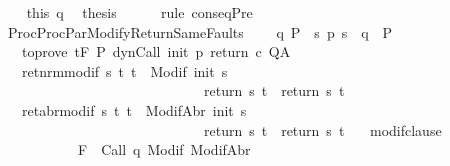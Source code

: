 \begin{isabellebody}
\ \ \isamarkupfalse%
\ this\ q\ \isamarkupfalse%
\ {\isacharquery}thesis\isanewline
\ \ \ \ \isamarkupfalse%
\ {\isacharparenleft}rule\ conseqPre{\isacharparenright}\ \isanewline
{}\isamarkupfalse%
%
\endisatagproof
{\isafoldproof}%
%
\isadelimproof
\isanewline
%
\endisadelimproof
\isanewline
\isanewline
\isanewline
{}\isamarkupfalse%
\ ProcProcParModifyReturnSameFaults{\isacharcolon}\ \isanewline
\ \ \ q{\isacharcolon}\ {\isachardoublequoteopen}P\ {\isasymsubseteq}\ {\isacharbraceleft}s{\isachardot}\ p\ s\ {\isacharequal}\ q{\isacharbraceright}\ {\isasyminter}\ P{\isacharprime}{\isachardoublequoteclose}\isanewline
\ \ \ %
\isanewline
\ \ \ to{\isacharunderscore}prove{\isacharcolon}\ {\isachardoublequoteopen}{\isasymGamma}{\isacharcomma}{\isasymTheta}{\isasymturnstile}\isactrlsub t\isactrlbsub {\isacharslash}F\isactrlesub \ P{\isacharprime}\ {\isacharparenleft}dynCall\ init\ p\ return{\isacharprime}\ c{\isacharparenright}\ Q{\isacharcomma}A{\isachardoublequoteclose}\isanewline
\ \ \ ret{\isacharunderscore}nrm{\isacharunderscore}modif{\isacharcolon}\ {\isachardoublequoteopen}{\isasymforall}s\ t{\isachardot}\ t\ {\isasymin}\ {\isacharparenleft}Modif\ {\isacharparenleft}init\ s{\isacharparenright}{\isacharparenright}\ \isanewline
\ \ \ \ \ \ \ \ \ \ \ \ \ \ \ \ \ \ \ \ \ \ \ \ \ \ \ \ {\isasymlongrightarrow}\ return{\isacharprime}\ s\ t\ {\isacharequal}\ return\ s\ t{\isachardoublequoteclose}\isanewline
\ \ \ ret{\isacharunderscore}abr{\isacharunderscore}modif{\isacharcolon}\ {\isachardoublequoteopen}{\isasymforall}s\ t{\isachardot}\ t\ {\isasymin}\ {\isacharparenleft}ModifAbr\ {\isacharparenleft}init\ s{\isacharparenright}{\isacharparenright}\ \isanewline
\ \ \ \ \ \ \ \ \ \ \ \ \ \ \ \ \ \ \ \ \ \ \ \ \ \ \ \ {\isasymlongrightarrow}\ return{\isacharprime}\ s\ t\ {\isacharequal}\ return\ s\ t{\isachardoublequoteclose}\isanewline
\ \ \ modif{\isacharunderscore}clause{\isacharcolon}\ \isanewline
\ \ \ \ \ \ \ \ \ \ {\isachardoublequoteopen}{\isasymforall}{\isasymsigma}{\isachardot}\ {\isasymGamma}{\isacharcomma}{\isasymTheta}{\isasymturnstile}\isactrlbsub {\isacharslash}F\isactrlesub \ {\isacharbraceleft}{\isasymsigma}{\isacharbraceright}\ Call\ q\ {\isacharparenleft}Modif\ {\isasymsigma}{\isacharparenright}{\isacharcomma}{\isacharparenleft}ModifAbr\ {\isasymsigma}{\isacharparenright}{\isachardoublequoteclose}\isanewline

\end{isabellebody}
